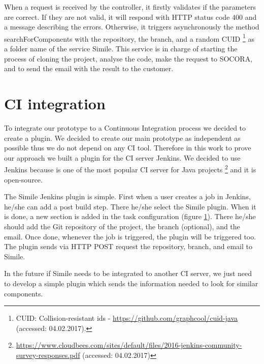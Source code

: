 When a request is received by the controller, it firstly validates if the parameters are correct. If they are not valid, it will respond with HTTP status code 400 and a message describing the errors. Otherwise, it triggers asynchronously the method searchForComponents with the repository, the branch, and a random CUID \footnote{CUID: Collision-resistant ids - \url{https://github.com/graphcool/cuid-java} (accessed: 04.02.2017).} as a folder name of the service Simile. This service is in charge of starting the process of cloning the project, analyse the code, make the request to SOCORA, and to send the email with the result to the customer.

\section{CI integration}
To integrate our prototype to a Continuous Integration process we decided to create a plugin. We decided to create our main prototype as independent as possible thus we do not depend on any CI tool. Therefore in this work to prove our approach we built a plugin for the CI server Jenkins. We decided to use Jenkins because is one of the most popular CI server for Java projects \footnote{\url{https://www.cloudbees.com/sites/default/files/2016-jenkins-community-survey-responses.pdf} (accessed: 04.02.2017)} and it is open-source.

The Simile Jenkins plugin is simple. First when a user creates a job in Jenkins, he/she can add a post build step. There he/she select the Simile plugin. When it is done, a new section is added in the task configuration (figure \ref{}). There he/she should add the Git repository of the project, the branch (optional), and the email. Once done, whenever the job is triggered, the plugin will be triggered too. The plugin sends via HTTP POST request the repository, branch, and email to Simile.


In the future if Simile needs to be integrated to another CI server, we just need to develop a simple plugin which sends the information needed to look for similar components. 